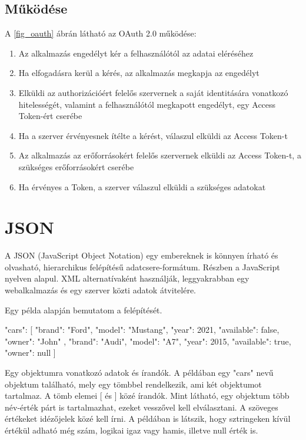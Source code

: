 \subsection*{Működése} 

A \ref{fig_oauth} ábrán látható az OAuth 2.0 működése: 



\begin{enumerate}
\item Az alkalmazás engedélyt kér a felhasználótól az adatai eléréséhez 
\item Ha elfogadásra kerül a kérés, az alkalmazás megkapja az engedélyt 
\item Elküldi az authorizációért felelős szervernek a saját identitására vonatkozó hitelességét, valamint a felhasználótól megkapott engedélyt, egy Access Token-ért cserébe 
\item Ha a szerver érvényesnek ítélte a kérést, válaszul elküldi az Access Token-t 
\item Az alkalmazás az erőforrásokért felelős szervernek elküldi az Access Token-t, a szükséges erőforrásokért cserébe 
\item Ha érvényes a Token, a szerver válaszul elküldi a szükséges adatokat 
\end{enumerate}


\section{JSON}

A JSON (JavaScript Object Notation) egy embereknek is könnyen írható és olvasható, hierarchikus felépítésű adatcsere-formátum. Részben a JavaScript nyelven alapul. XML alternatívaként használják, leggyakrabban egy webalkalmazás és egy szerver közti adatok átvitelére. 

Egy példa alapján bemutatom a felépítését. 

{"cars": [{ 
"brand": "Ford", 
"model": "Mustang", 
"year": 2021, 
"available": false, 
"owner": "John" 
        }, { 
"brand": "Audi", 
"model": "A7", 
"year": 2015, 
"available": true, 
"owner": null 
        } 
]} 

Egy objektumra vonatkozó adatok { és } írandók. A példában egy "cars" nevű objektum található, mely egy tömbbel rendelkezik, ami két objektumot tartalmaz. A tömb elemei [ és ] közé írandók. Mint látható, egy objektum több név-érték párt is tartalmazhat, ezeket vesszővel kell elválasztani. A szöveges értékeket idézőjelek közé kell írni. A példában is látszik, hogy sztringeken kívül értékül adható még szám, logikai igaz vagy hamis, illetve null érték is. 

